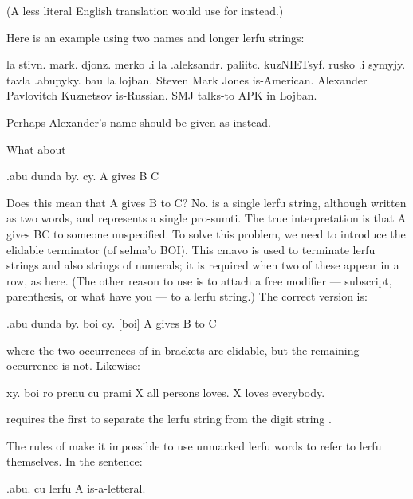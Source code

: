 (A less literal English translation would use  for 
    instead.) 

Here is an example using two names and longer lerfu
    strings:
\begin{example}
la stivn. mark. djonz. merko\n
\T	.i la .aleksandr. paliitc. kuzNIETsyf. rusko\n
\T	.i symyjy. tavla .abupyky. bau la lojban.\n
Steven Mark Jones is-American.\n
\T	Alexander Pavlovitch Kuznetsov is-Russian.\n
\T	SMJ talks-to APK in Lojban.
\end{example}

Perhaps Alexander's name should be given as 
    instead.

What about
\begin{example}
.abu dunda by. cy.\n
A gives B C
\end{example}

Does this mean that A gives B to C? No.  is a single
    lerfu string, although written as two words, and represents a
    single pro-sumti. The true interpretation is that A gives BC to
    someone unspecified. To solve this problem, we need to
    introduce the elidable terminator  (of selma'o BOI).
    This cmavo is used to terminate lerfu strings and also strings
    of numerals; it is required when two of these appear in a row,
    as here. (The other reason to use  is to attach a free
    modifier --- subscript, parenthesis, or what have you --- to a
    lerfu string.) The correct version is:
\begin{example}
.abu  dunda by. boi cy. [boi]\n
A gives B to C
\end{example}

{\noindent}where the two occurrences of  in brackets are elidable,
    but the remaining occurrence is not. Likewise:
\begin{example}
xy. boi ro  prenu cu prami\n
X all persons loves.\n
X loves everybody.
\end{example}

{\noindent}requires the first  to separate the lerfu string 
    from the digit string .



The rules of  make it impossible
    to use unmarked lerfu words to refer to lerfu themselves. In
    the sentence:
\begin{example}
.abu. cu lerfu\n
A is-a-letteral.
\end{example}

